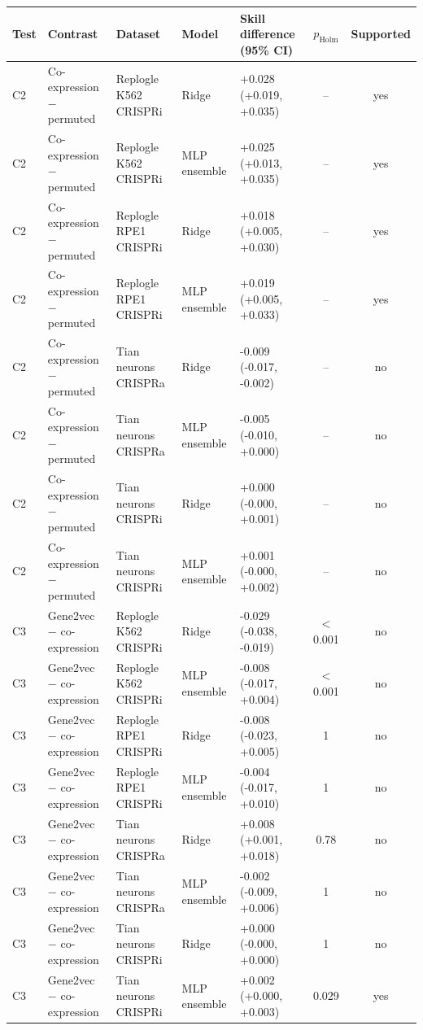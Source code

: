 \begin{tabular}{lllllcc}
\toprule
Test & Contrast & Dataset & Model & Skill difference (95\% CI) & $p_{\mathrm{Holm}}$ & Supported \\
\midrule
C2 & Co-expression $-$ permuted & Replogle K562 CRISPRi & Ridge & +0.028 (+0.019, +0.035) & -- & yes \\
C2 & Co-expression $-$ permuted & Replogle K562 CRISPRi & MLP ensemble & +0.025 (+0.013, +0.035) & -- & yes \\
C2 & Co-expression $-$ permuted & Replogle RPE1 CRISPRi & Ridge & +0.018 (+0.005, +0.030) & -- & yes \\
C2 & Co-expression $-$ permuted & Replogle RPE1 CRISPRi & MLP ensemble & +0.019 (+0.005, +0.033) & -- & yes \\
C2 & Co-expression $-$ permuted & Tian neurons CRISPRa & Ridge & -0.009 (-0.017, -0.002) & -- & no \\
C2 & Co-expression $-$ permuted & Tian neurons CRISPRa & MLP ensemble & -0.005 (-0.010, +0.000) & -- & no \\
C2 & Co-expression $-$ permuted & Tian neurons CRISPRi & Ridge & +0.000 (-0.000, +0.001) & -- & no \\
C2 & Co-expression $-$ permuted & Tian neurons CRISPRi & MLP ensemble & +0.001 (-0.000, +0.002) & -- & no \\
C3 & Gene2vec $-$ co-expression & Replogle K562 CRISPRi & Ridge & -0.029 (-0.038, -0.019) & $<$0.001 & no \\
C3 & Gene2vec $-$ co-expression & Replogle K562 CRISPRi & MLP ensemble & -0.008 (-0.017, +0.004) & $<$0.001 & no \\
C3 & Gene2vec $-$ co-expression & Replogle RPE1 CRISPRi & Ridge & -0.008 (-0.023, +0.005) & 1 & no \\
C3 & Gene2vec $-$ co-expression & Replogle RPE1 CRISPRi & MLP ensemble & -0.004 (-0.017, +0.010) & 1 & no \\
C3 & Gene2vec $-$ co-expression & Tian neurons CRISPRa & Ridge & +0.008 (+0.001, +0.018) & 0.78 & no \\
C3 & Gene2vec $-$ co-expression & Tian neurons CRISPRa & MLP ensemble & -0.002 (-0.009, +0.006) & 1 & no \\
C3 & Gene2vec $-$ co-expression & Tian neurons CRISPRi & Ridge & +0.000 (-0.000, +0.000) & 1 & no \\
C3 & Gene2vec $-$ co-expression & Tian neurons CRISPRi & MLP ensemble & +0.002 (+0.000, +0.003) & 0.029 & yes \\
\bottomrule
\end{tabular}